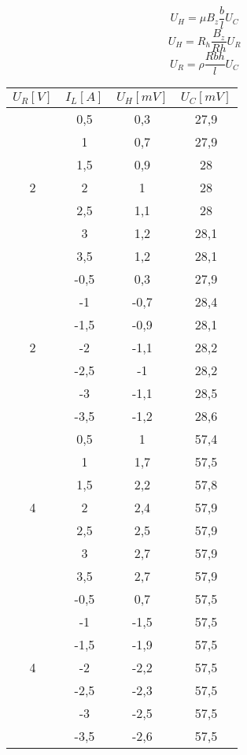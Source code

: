 \documentclass[11pt]{article}
\begin{document}
$$ U_H = \mu B_z \frac{b}{l} U_C $$
$$ U_H = R_h \frac{B_z}{Rh} U_R $$
$$ U_R = \rho \frac{Rbh}{l} U_C $$


\newpage

\begin{multicols}{2}

\begin{tabular}{|c|c|c|c|}
\hline
$U_R[V]$ & $I_L[A]$ & $U_H[mV]$ & $U_C[mV]$ \\
\hline
\multirow{7}{*}{2} & 0,5 & 0,3 & 27,9 \\
& 1   & 0,7 & 27,9 \\
& 1,5 & 0,9 & 28 \\
& 2   & 1 & 28 \\
& 2,5 & 1,1 & 28 \\
& 3   & 1,2 & 28,1 \\
& 3,5 & 1,2 & 28,1 \\
\hline
\multirow{7}{*}{2} & -0,5 & 0,3 & 27,9 \\
& -1   & -0,7 & 28,4 \\
& -1,5 & -0,9 & 28,1 \\
& -2   & -1,1 & 28,2 \\
& -2,5 & -1 & 28,2 \\
& -3   & -1,1 & 28,5 \\
& -3,5 & -1,2 & 28,6 \\
\hline

\multirow{7}{*}{4} & 0,5 & 1 & 57,4 \\
& 1   & 1,7 & 57,5 \\
& 1,5 & 2,2 & 57,8 \\
& 2   & 2,4 & 57,9 \\
& 2,5 & 2,5 & 57,9 \\
& 3   & 2,7 & 57,9 \\
& 3,5 & 2,7 & 57,9 \\
\hline
\multirow{7}{*}{4} & -0,5 & 0,7 & 57,5 \\
& -1   & -1,5 & 57,5 \\
& -1,5 & -1,9 & 57,5 \\
& -2   & -2,2 & 57,5 \\
& -2,5 & -2,3 & 57,5 \\
& -3   & -2,5 & 57,5 \\
& -3,5 & -2,6 & 57,5 \\
\hline


\end{tabular}
\end{multicols}
\end{document}
